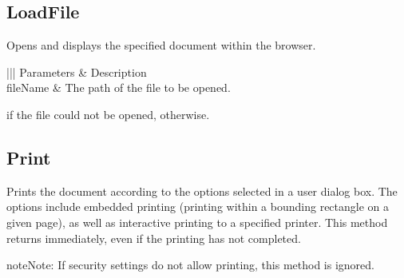 \documentclass[letterpaper,12pt,english,openany,oneside]{sphinxmanual}
\begin{document}
\subsection{LoadFile}
\label{\detokenize{IAC_API_OLE_Objects:loadfile}}
Opens and displays the specified document within the browser.


\begin{sphinxVerbatim}[commandchars=\\\{\}]
  
\end{sphinxVerbatim}
\label{\detokenize{IAC_API_OLE_Objects:parameters-80}}


\begin{savenotes}\sphinxattablestart
\centering
{}\label{\detokenize{IAC_API_OLE_Objects:section-95}}\nobreak
\begin{tabular}[t]{|||}
\hline
\sphinxstyletheadfamily 
Parameters
&\sphinxstyletheadfamily 
Description
\\
\hline
fileName
&
The path of the file to be opened.
\\
\hline
\end{tabular}
\par
\sphinxattableend\end{savenotes}


 if the file could not be opened,  otherwise.




\subsection{Print}
\label{\detokenize{IAC_API_OLE_Objects:print}}
Prints the document according to the options selected in a user dialog box. The options include embedded printing (printing within a bounding rectangle on a given page), as well as interactive printing to a specified printer. This method returns immediately, even if the printing has not completed.

\begin{sphinxadmonition}{note}{Note:}
If security settings do not allow printing, this method is ignored.
\end{sphinxadmonition}
\end{document}
